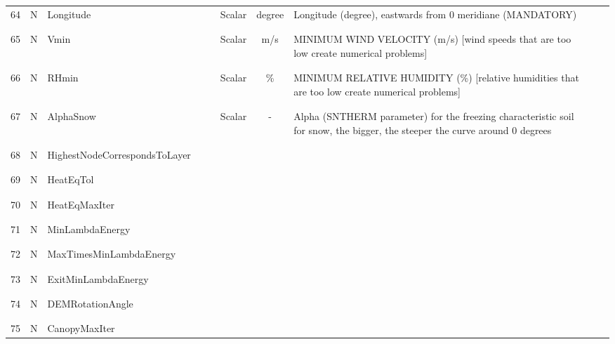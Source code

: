 \begin{longtable}{|c|c|l|c|c|c|c|p{}|c|p{}|}
64 & N & Longitude & & & Scalar & degree & \parbox[c]{\hsize}{Longitude (degree), eastwards from 0 meridiane (MANDATORY)} & & \\
&&&&&&&&&\\\hline%
&&&&&&&&&\\
65 & N & Vmin & & & Scalar & m/s & \parbox[c]{\hsize}{MINIMUM WIND VELOCITY (m/s) [wind speeds that are too low create numerical problems]} & & \\
&&&&&&&&&\\\hline%
&&&&&&&&&\\
66 & N & RHmin & & & Scalar & \% & \parbox[c]{\hsize}{MINIMUM RELATIVE HUMIDITY (\%) [relative humidities that are too low create numerical problems]} & & \\
&&&&&&&&&\\\hline%
&&&&&&&&&\\
67 & N & AlphaSnow & & & Scalar & - & \parbox[c]{\hsize}{Alpha (SNTHERM parameter) for the freezing characteristic soil for snow, the bigger, the steeper the curve around 0 degrees} & & \\
&&&&&&&&&\\\hline%
&&&&&&&&&\\
68 & N & HighestNodeCorrespondsToLayer & & & & & & & \\
&&&&&&&&&\\\hline%
&&&&&&&&&\\
69 & N & HeatEqTol & & & & & & & \\
&&&&&&&&&\\\hline%
&&&&&&&&&\\
70 & N & HeatEqMaxIter & & & & & & & \\
&&&&&&&&&\\\hline%
&&&&&&&&&\\
71 & N & MinLambdaEnergy & & & & & & & \\
&&&&&&&&&\\\hline%
&&&&&&&&&\\
72 & N & MaxTimesMinLambdaEnergy & & & & & & & \\
&&&&&&&&&\\\hline%
&&&&&&&&&\\
73 & N & ExitMinLambdaEnergy & & & & & & & \\
&&&&&&&&&\\\hline%
&&&&&&&&&\\
74 & N & DEMRotationAngle & & & & & & & \\
&&&&&&&&&\\\hline%
&&&&&&&&&\\
75 & N & CanopyMaxIter & & & & & & & \\

\end{longtable}
